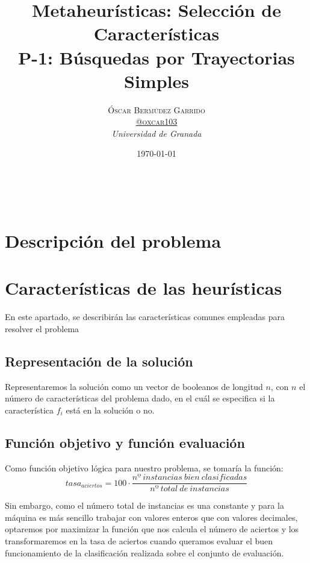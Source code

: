 \documentclass[a4paper, 11pt]{article}
\title{\textbf{Metaheurísticas: Selección de Características}\\ %
P-1: Búsquedas por Trayectorias Simples} %
\author{\textsc{Óscar Bermúdez Garrido\\
\href{http://www.github.com/oxcar103}{@oxcar103}} %
\\{\textit{Universidad de Granada}}} %
\date{\today} %
\makeatletter
\renewcommand{\maketitle}{
  \begin{flushright} %
  {\LARGE\@title} %
  
  \vspace{50pt} %
  
  {\large\@author} %
  \\\@date %
  \vspace{40pt} %
  \end{flushright}
}
\makeatother
\begin{document}
\maketitle %

\renewcommand{\abstractname}{Resumen} %



{\parskip=2pt
  \tableofcontents
}
\pagebreak

	\section{Descripción del problema}
		

	\section{Características de las heurísticas}
		En este apartado, se describirán las características comunes empleadas para resolver
		el problema
		
		\subsection{Representación de la solución}
			Representaremos la solución como un vector de booleanos de longitud $n$, con $n$
			el número de características del problema dado, en el cuál se especifica si la
			característica $f_i$ está en la solución o no.
		
		\subsection{Función objetivo y función evaluación}
			Como función objetivo lógica para nuestro problema, se tomaría la función:
			$$tasa_{aciertos} = 100 \cdot \frac{nº\ instancias\ bien\ clasificadas}{nº\ total\ de\ instancias}$$
			
			Sin embargo, como el número total de instancias es una constante y para la máquina
			es más sencillo trabajar con valores enteros que con valores decimales, optaremos
			por maximizar la función que nos calcula el número de aciertos y los transformaremos
			en la tasa de aciertos cuando queramos evaluar el buen funcionamiento de la
			clasificación realizada sobre el conjunto de evaluación.
			
\end{document}
